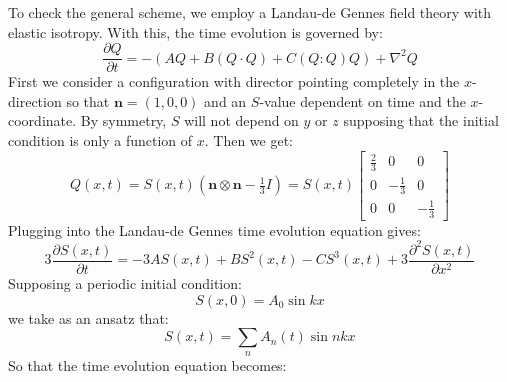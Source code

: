 \documentclass[reqno]{article}
\begin{document}
To check the general scheme, we employ a Landau-de Gennes field theory with elastic isotropy.
With this, the time evolution is governed by:
\begin{equation}
    \frac{\partial Q}{\partial t}
    =
    - \left( A Q + B (Q \cdot Q) + C (Q : Q) Q \right)
    + \nabla^2 Q
\end{equation}
First we consider a configuration with director pointing completely in the $x$-direction so that $\mathbf{n} = (1, 0, 0)$ and an $S$-value dependent on time and the $x$-coordinate.
By symmetry, $S$ will not depend on $y$ or $z$ supposing that the initial condition is only a function of $x$.
Then we get:
\begin{equation}
    Q(x, t)
    =
    S(x, t) \left( \mathbf{n} \otimes \mathbf{n} - \tfrac13 I \right)
    =
    S(x, t)
    \begin{bmatrix}
        \tfrac23 &0 &0 \\
        0 &-\tfrac13 &0 \\
        0 &0 &-\tfrac13
    \end{bmatrix}
\end{equation}
Plugging into the Landau-de Gennes time evolution equation gives:
\begin{equation}
    3 \frac{\partial S(x, t)}{\partial t} 
    =
    - 3 A S(x, t)
    + B S^2(x, t)
    - C S^3(x, t)
    + 3 \frac{\partial^2 S(x, t)}{\partial x^2}
\end{equation}
Supposing a periodic initial condition:
\begin{equation}
    S(x, 0)
    =
    A_0 \sin k x
\end{equation}
we take as an ansatz that:
\begin{equation}
    S(x, t)
    = \sum_n A_n (t) \sin nkx
\end{equation}
So that the time evolution equation becomes:
\end{document}
